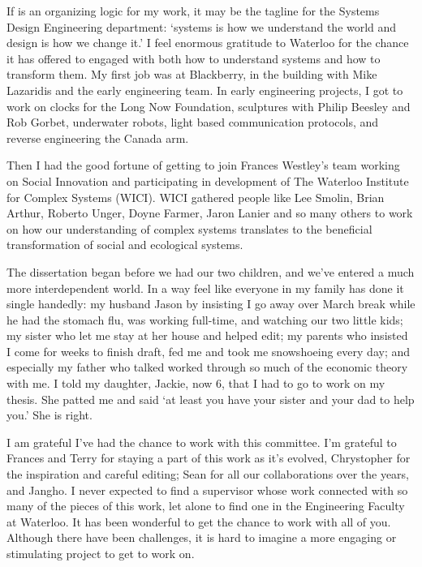 If is an organizing logic for my work, it may be the tagline for the Systems Design Engineering department: `systems is how we understand the world and design is how we change it.' I feel enormous gratitude to Waterloo for the chance it has offered to engaged with both how to understand systems and how to transform them.  My first job was at Blackberry, in the building with  Mike Lazaridis and the early engineering team. In early engineering projects, I got to work on clocks for the Long Now Foundation, sculptures with Philip Beesley and Rob Gorbet, underwater robots, light based communication protocols, and reverse engineering the Canada arm.

Then I had the good fortune of getting to join Frances Westley's team working on Social Innovation and participating in development of The Waterloo Institute for Complex Systems (WICI). WICI gathered people like Lee Smolin, Brian Arthur, Roberto Unger, Doyne Farmer, Jaron Lanier and so many others to work on how our understanding of complex systems translates to the beneficial transformation of social and ecological systems. 

The dissertation began before we had our two children, and we've entered a much more interdependent world. In a way feel like everyone in my family has done it single handedly: my husband Jason by insisting I go away over March break while he had the stomach flu, was working full-time, and watching our two little kids; my sister who let me stay at her house and helped edit; my parents who insisted I come for weeks to finish draft, fed me and took me snowshoeing every day; and especially my father who talked worked through so much of the economic theory with me. I told my daughter, Jackie, now 6, that I had to go to work on my thesis. She patted me and said `at least you have your sister and your dad to help you.' She is right. 

I am grateful I've had the chance to work with this committee. I'm grateful to Frances and Terry for staying a part of this work as it's evolved, Chrystopher for the inspiration and careful editing; Sean for all our collaborations over the years, and Jangho. I never expected to find a supervisor whose work connected with so many of the pieces of this work, let alone to find one in the Engineering Faculty at Waterloo. It has been wonderful to get the chance to work with all of you. Although there have been challenges, it is hard to imagine a more engaging or stimulating project to get to work on. 



